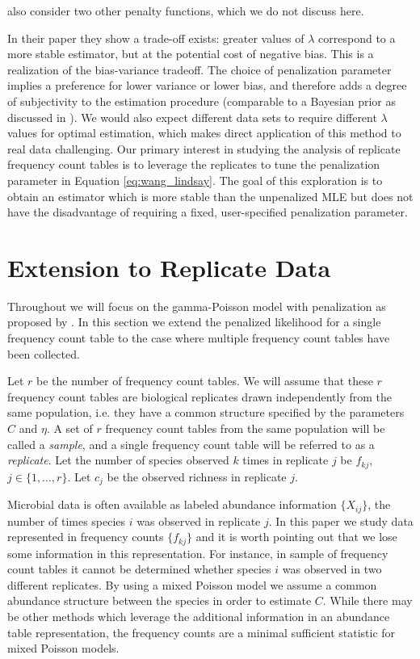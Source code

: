 \documentclass[oupdraft]{bio}
\begin{document}
\citet{wang_2005} also consider two other penalty functions, which we do not discuss here.

In their paper they show a trade-off exists: greater values of $\lambda$ correspond to a more stable estimator, but at the potential cost of negative bias.  This is a realization of the bias-variance tradeoff.
The choice of penalization parameter implies a preference for lower variance or lower bias, and therefore adds a degree of subjectivity to the estimation procedure (comparable to a Bayesian prior as discussed in \citet{wang_2005}).  We would also expect different data sets to require different $\lambda$ values for optimal estimation, which makes direct application of this method to real data challenging.  Our primary interest in studying the analysis of replicate frequency count tables is to leverage the replicates to tune the penalization parameter in Equation \ref{eq:wang_lindsay}.  The goal of this exploration is to obtain an estimator which is more stable than the unpenalized MLE but does not have the disadvantage of requiring a fixed, user-specified penalization parameter.


\section{Extension to Replicate Data}
\label{sec:fixed_lambda}

Throughout we will focus on the gamma-Poisson model with penalization as proposed by \citet{wang_2005}.  In this section we extend the penalized likelihood for a single frequency count table to the case where multiple frequency count tables have been collected.

Let $r$ be the number of frequency count tables.  We will assume that these $r$ frequency count tables are biological replicates drawn independently from the same population, i.e. they have a common structure specified by the parameters $C$ and $\eta$.  A set of $r$ frequency count tables from the same population will be called a \textit{sample}, and a single frequency count table will be referred to as a \textit{replicate}.  Let the number of species observed $k$ times in replicate $j$ be $f_{kj}$, $j \in \{1, \dots , r\}$.  Let $c_j$ be the observed richness in replicate $j$.

Microbial data is often available as labeled abundance information $\{ X_{ij} \}$, the number of times species $i$ was observed in replicate $j$.  In this paper we study data represented in frequency counts $\{f_{kj}\}$ and it is worth pointing out that we lose some information in this representation.  For instance, in sample of frequency count tables it cannot be determined whether species $i$ was observed in two different replicates.  By using a mixed Poisson model we assume a common abundance structure between the species in order to estimate $C$.  While there may be other methods which leverage the additional information in an abundance table representation, the frequency counts are a minimal sufficient statistic for mixed Poisson models.
\end{document}
